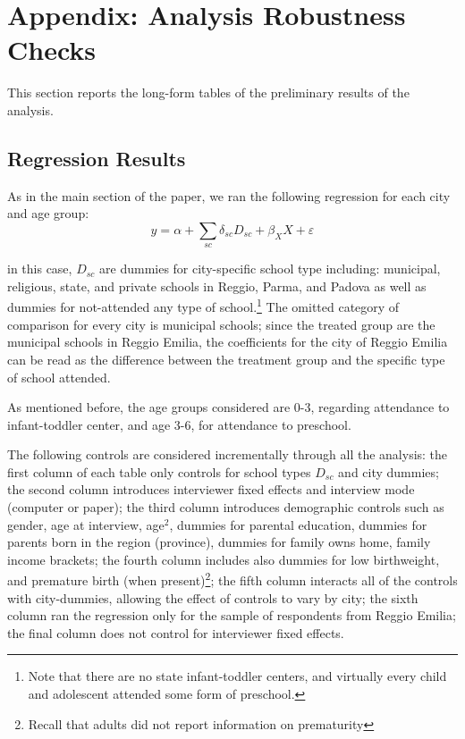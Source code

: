 \section{Appendix: Analysis Robustness Checks} 
\label{app:analysis}
This section reports the long-form tables of the preliminary results of the analysis. 

\subsection{Regression Results}
\label{app:OLS}

As in the main section of the paper, we ran the following regression for each city and age group:
\[ 
y = \alpha + \sum_{sc} \delta_{sc} D_{sc} + \beta_{X}X + \varepsilon
\]

in this case, $D_{sc}$ are dummies for city-specific school type including: municipal, religious, state, and private schools in Reggio, Parma, and Padova as well as dummies for not-attended any type of school.\footnote{Note that there are no state infant-toddler centers, and virtually every child and adolescent attended some form of preschool.} The omitted category of comparison for every city is municipal schools; since the treated group are the municipal schools in Reggio Emilia, the coefficients for the city of Reggio Emilia can be read as the difference between the treatment group and the specific type of school attended.

As mentioned before, the age groups considered are 0-3, regarding attendance to infant-toddler center, and age 3-6, for attendance to preschool. 

The following controls are considered incrementally through all the analysis: the first column of each table only controls for school types $D_{sc}$ and city dummies; the second column introduces interviewer fixed effects and interview mode (computer or paper); the third column introduces demographic controls such as gender, age at interview, age$^2$, dummies for parental education, dummies for parents born in the region (province), dummies for family owns home, family income brackets; the fourth column includes also dummies for low birthweight, and premature birth (when present)\footnote{Recall that adults did not report information on prematurity}; the fifth column interacts all of the controls with city-dummies, allowing the effect of controls to vary by city; the sixth column ran the regression only for the sample of respondents from Reggio Emilia; the final column does not control for interviewer fixed effects.


